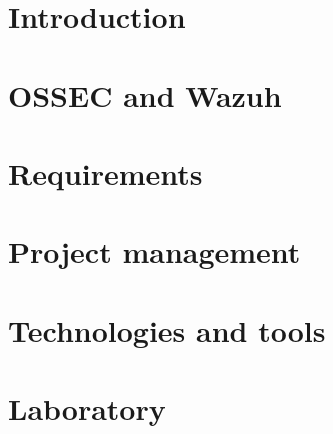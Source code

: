 \documentclass[12pt,twoside,a4paper]{book}
\begin{document}


\cleardoublepage



\cleardoublepage
\pagestyle{plain}
\tableofcontents
\listoffigures
\listoftables



\cleardoublepage
{}
\setcounter{page}{1}
\pagestyle{headings}
\chapter{Introduction}


\cleardoublepage
\chapter{OSSEC and Wazuh}


\cleardoublepage
\chapter{Requirements}


\cleardoublepage
\chapter{Project management}







\cleardoublepage
\chapter{Technologies and tools}


\cleardoublepage
\chapter{Laboratory}

\end{document}
